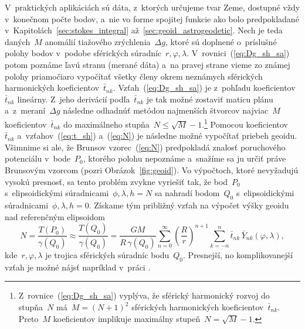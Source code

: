 \documentclass[a4paper, 12pt]{book}
\begin{document}
V~praktických aplikáciách sú dáta, z~ktorých určujeme tvar Zeme, dostupné vždy 
v~konečnom počte bodov, a~nie vo forme spojitej funkcie ako bolo predpokladané 
v~Kapitolách~\ref{sec:stokes_integral} až~\ref{sec:geoid_astrogeodetic}.  Nech 
je teda daných~$M$ anomálií tiažového zrýchlenia~$\Delta g$, ktoré sú doplnené 
o~príslušné polohy bodov v~podobe sférických súradníc~$r, \varphi, \lambda$.  
V~rovnici~(\ref{eq:Dg_sh_sa}) potom poznáme ľavú stranu (merané dáta) a~na 
pravej strane vieme zo známej polohy priamočiaro vypočítať všetky členy okrem 
neznámych sférických harmonických koeficientov~$\bar{t}_{nk}$.  
Vzťah~(\ref{eq:Dg_sh_sa}) je z~pohľadu koeficientov~$\bar{t}_{nk}$ lineárny.  
Z~jeho derivácií podľa~$\bar{t}_{nk}$ je tak možné zostaviť maticu plánu 
a~z~meraní~$\Delta g$ následne odhadnúť metódou najmenších štvorcov najviac~$M$ 
koeficientov~$\bar{t}_{nk}$ do maximálneho stupňa~$N \leq \sqrt{M} 
- 1$.\footnote{Z~rovnice~(\ref{eq:Dg_sh_sa}) vyplýva, že sférický harmonický 
rozvoj do stupňa~$N$ má~$M = (N + 1)^2$ sférických harmonických 
koeficientov~$\bar{t}_{nk}$.  Preto~$M$ koeficientov implikuje maximálny 
stupeň~$N = \sqrt{M} - 1$.}  Pomocou koeficientov~$\bar{t}_{nk}$ 
a~vzťahov~(\ref{eq:t_sh}) a~(\ref{eq:N}) je následne možné vypočítať priebeh 
geoidu.  Všimnime si ale, že Brunsov vzorec~(\ref{eq:N}) predpokladá znalosť 
poruchového potenciálu v~bode~$P_0$, ktorého polohu nepoznáme a~snažíme sa ju 
určiť práve Brunsovým vzorcom (pozri Obrázok~\ref{fig:geoid}). Vo výpočtoch, 
ktoré nevyžadujú vysokú presnosť, sa tento problém zvykne vyriešiť tak, že 
bod~$P_0$ s~elipsoidickými súradnicami~$\phi, \lambda, h = N$ sa nahradí 
bodom~$Q_0$ s~elipsoidickými súradnicami~$\phi, \lambda, h = 0$.  Získame tým 
približný vzťah na výpočet výšky geoidu nad referenčným elipsoidom
%
\begin{equation}
\label{eq:geoid_sh}
N = \frac{T(P_0)}{\gamma(Q_0)} \approx \frac{T(Q_0)}{\gamma(Q_0)} = \frac{GM}{R 
\, \gamma(Q_0)} \sum_{n = 0}^\infty \left( \frac{R}{r} \right)^{n
+ 1} \sum_{k = -n}^{n} \bar{t}_{nk} \, \bar{Y}_{nk}(\varphi, \lambda){,}
\end{equation}
%
kde~$r, \varphi, \lambda$ je trojica sférických súradníc bodu~$Q_0$.  
Presnejší, no komplikovanejší vzťah je možné nájsť napríklad v~práci 
\textcite{Barthelmes2013}.
\end{document}
